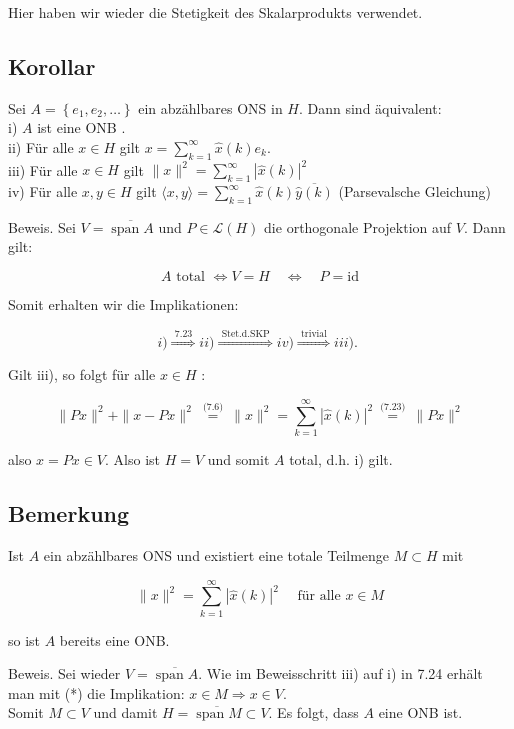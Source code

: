 \documentclass[10pt, letterpaper]{article}
\begin{document}
Hier haben wir wieder die Stetigkeit des Skalarprodukts verwendet.

\subsection*{Korollar}
Sei $A=\left\{e_{1}, e_{2}, \ldots\right\}$ ein abzählbares ONS in $H$. Dann sind äquivalent:\\
i) $A$ ist eine ONB .\\
ii) Für alle $x \in H$ gilt $x=\sum_{k=1}^{\infty} \hat{x}(k) e_{k}$.\\
iii) Für alle $x \in H$ gilt $\|x\|^{2}=\sum_{k=1}^{\infty}|\hat{x}(k)|^{2}$\\
iv) Für alle $x, y \in H$ gilt $\langle x, y\rangle=\sum_{k=1}^{\infty} \hat{x}(k) \overline{\hat{y}(k)}$ (Parsevalsche Gleichung)

Beweis. Sei $V=\overline{\operatorname{span} A}$ und $P \in \mathcal{L}(H)$ die orthogonale Projektion auf $V$. Dann gilt:

$$
A \text { total } \Longleftrightarrow V=H \quad \Longleftrightarrow \quad P=\mathrm{id}
$$

Somit erhalten wir die Implikationen:

$$
i) \stackrel{\text { 7.23 }}{\Longrightarrow} i i) \stackrel{\text { Stet.d.SKP }}{\Longrightarrow} i v) \stackrel{\text { trivial }}{\Longrightarrow} i i i) \text {. }
$$

Gilt iii), so folgt für alle $x \in H$ :

$$
\|P x\|^{2}+\|x-P x\|^{2} \stackrel{\text { (7.6) }}{=}\|x\|^{2}=\sum_{k=1}^{\infty}|\hat{x}(k)|^{2} \stackrel{\text { (7.23) }}{=}\|P x\|^{2}
$$

also $x=P x \in V$. Also ist $H=V$ und somit $A$ total, d.h. i) gilt.

\subsection*{Bemerkung}
Ist $A$ ein abzählbares ONS und existiert eine totale Teilmenge $M \subset H$ mit

$$
\|x\|^{2}=\sum_{k=1}^{\infty}|\hat{x}(k)|^{2} \quad \text { für alle } x \in M
$$

so ist $A$ bereits eine ONB.

Beweis. Sei wieder $V=\overline{\operatorname{span} A}$. Wie im Beweisschritt iii) auf i) in 7.24 erhält man mit (*) die Implikation: $x \in M \Longrightarrow x \in V$.\\
Somit $M \subset V$ und damit $H=\overline{\operatorname{span} M} \subset V$. Es folgt, dass $A$ eine ONB ist.
\end{document}
